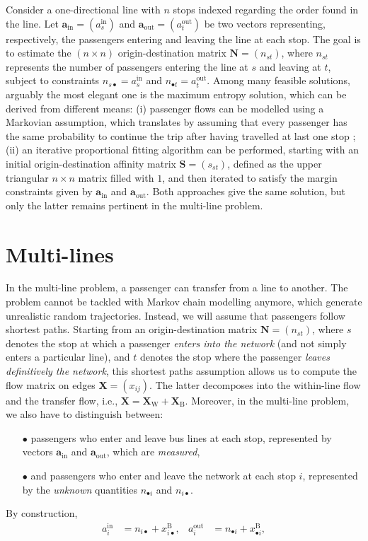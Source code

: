 \documentclass{llncs}
\begin{document}
Consider a one-directional line with $n$ stops indexed regarding the order found in the line.  Let $\mathbf{a}_\text{in} = (a_{s}^\text{in})$ and $\mathbf{a}_\text{out} = (a_{t}^\text{out})$ be two vectors representing, respectively, the passengers entering and leaving the line at each stop. The goal is to estimate the $(n \times n)$ origin-destination matrix $\mathbf{N} = (n_{st})$, where $n_{st}$ represents the number of passengers entering the line at $s$ and leaving at $t$, subject to constraints $n_{s\bullet} = a^\text{in}_s$ and $n_{\bullet t} = a^\text{out}_t$.  Among many feasible solutions, arguably the most elegant one is the maximum entropy solution, which can be derived  from different means:  (i) passenger flows can be modelled using a Markovian assumption, which translates by assuming that every passenger has the same probability to continue the trip after having travelled at last one stop ; (ii) an iterative proportional fitting algorithm can be performed, starting with an initial origin-destination affinity matrix $\mathbf{S} = (s_{st})$, defined as the upper triangular $n\times n$ matrix filled with $1$, and then iterated to satisfy the margin constraints given by $\mathbf{a}_\text{in}$ and $\mathbf{a}_\text{out}$. Both approaches give the same solution, but only the latter remains pertinent in the multi-line problem.

%
\section{Multi-lines}
%

In the multi-line problem, a passenger can transfer from a line to another. The problem cannot be tackled with Markov chain modelling anymore, which generate unrealistic random trajectories. Instead, we will assume that passengers follow shortest paths. Starting from an origin-destination matrix $\mathbf{N} = (n_{st})$, where $s$ denotes the stop at which a passenger \emph{enters into the network} (and not simply enters a particular line), and $t$ denotes the stop where the passenger \emph{leaves definitively the network}, this shortest paths assumption allows us to compute the flow matrix on edges $\mathbf{X} = (x_{ij})$. The latter decomposes into the within-line flow and the transfer flow, i.e., $\mathbf{X}=\mathbf{X}_\text{W}+\mathbf{X}_\text{B}$. 
Moreover, in the multi-line problem, we also have to distinguish between:
\begin{itemize}
	\item[$\bullet$]  passengers who enter and leave bus lines at each stop, represented by vectors $\mathbf{a}_\text{in}$ and $\mathbf{a}_\text{out}$, which are \emph{measured},
	\item[$\bullet$] and passengers who enter and leave the network at each stop $i$, represented by the \emph{unknown} quantities $n_{\bullet i}$ and $n_{i \bullet}$.
\end{itemize}
By construction, 
\begin{align}
		a^\text{in}_i &=n_{i\bullet} + x^\text{B}_{i\bullet},  &
		a^\text{out}_i &= n_{\bullet i} + x^\text{B}_{\bullet i},
\end{align}
\end{document}
